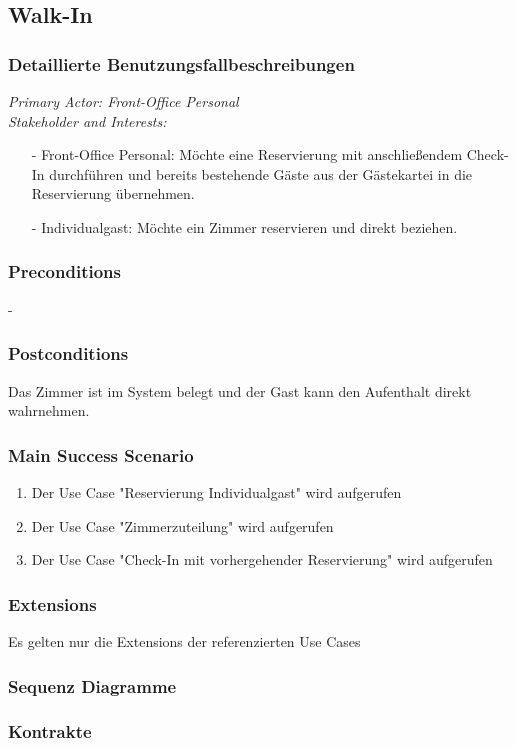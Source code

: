 \documentclass[./detailed_overview_usecases.tex]{subfiles}
\begin{document}
    \subsection{Walk-In}
    \subsubsection{Detaillierte Benutzungsfallbeschreibungen}

    \textit{Primary Actor: Front-Office Personal}
    \\
    \textit{Stakeholder and Interests:}
    \begin{itemize}
        \item[-] Front-Office Personal: Möchte eine Reservierung mit anschließendem Check-In durchführen und bereits bestehende Gäste aus der Gästekartei in die Reservierung übernehmen.
        \item[-] Individualgast: Möchte ein Zimmer reservieren und direkt beziehen.
    \end{itemize}

    \subsubsection*{Preconditions}
    -

    \subsubsection*{Postconditions}
    Das Zimmer ist im System belegt und der Gast kann den Aufenthalt direkt wahrnehmen.

    \subsubsection*{Main Success Scenario}
    \begin{enumerate}
        \item Der Use Case "Reservierung Individualgast" wird aufgerufen
        \item Der Use Case "Zimmerzuteilung" wird aufgerufen
        \item Der Use Case "Check-In mit vorhergehender Reservierung" wird aufgerufen
    \end{enumerate}

    \subsubsection*{Extensions}
    Es gelten nur die Extensions der referenzierten Use Cases

    \subsubsection{Sequenz Diagramme}
    \subsubsection{Kontrakte}
\end{document}
